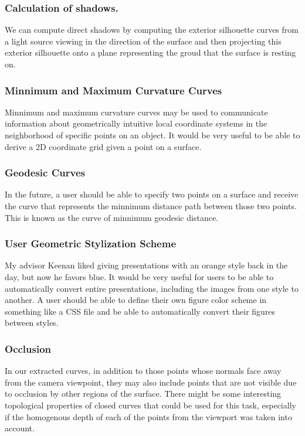 \documentclass[12pt, letterpaper]{article}
\begin{document}
		\subsubsection{Calculation of shadows.}
		We can compute direct shadows	by computing the exterior silhouette curves from a light source viewing in the direction of the surface and then projecting this exterior silhouette 
		onto a plane representing the groud that the surface is resting on.

		\subsubsection{Minnimum and Maximum Curvature Curves}
		Minnimum and maximum curvature curves may be used to communicate information about geometrically intuitive local coordinate systems in the neighborhood of specific points on an object.
		It would be very useful to be able to derive a 2D coordinate grid given a point on a surface.
	
		\subsubsection{Geodesic Curves}
		In the future, a user should be able to specify two points on a surface and receive the curve that represents the minnimum distance path between those two points.
		This is known as the curve of minnimum geodesic distance.
	
		\subsubsection{User Geometric Stylization Scheme}
		My advisor Keenan liked giving presentations with an orange style back in the day, but now he favors blue.
		It would be very useful for users to be able to automatically convert entire presentations, including the images from one style to another.
		A user should be able to define their own figure color scheme in something like a CSS file and be able to automatically convert their figures between styles.

		\subsubsection{Occlusion}

		In our extracted curves, in addition to those points whose normals face away from the camera viewpoint,
		they may also include points that are not visible due to occlusion by other regions of the surface.
		There might be some interesting topological properties of closed curves that could be used for this task,
		especially if the homogenous depth of each of the points from the viewport was taken into account.
\end{document}
